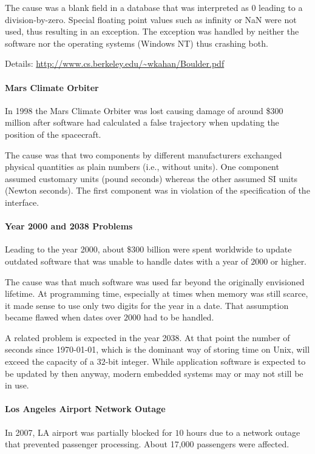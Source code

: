 The cause was a blank field in a database that was interpreted as $0$ leading to a division-by-zero.
Special floating point values such as infinity or NaN were not used, thus resulting in an exception.
The exception was handled by neither the software nor the operating systems (Windows NT) thus crashing both.

Details: \url{http://www.cs.berkeley.edu/~wkahan/Boulder.pdf}

\paragraph{Mars Climate Orbiter}
In 1998 the Mars Climate Orbiter was lost causing damage of around \$$300$ million after software had calculated a false trajectory when updating the position of the spacecraft.

The cause was that two components by different manufacturers exchanged physical quantities as plain numbers (i.e., without units).
One component assumed customary units (pound seconds) whereas the other assumed SI units (Newton seconds).
The first component was in violation of the specification of the interface.

\paragraph{Year 2000 and 2038 Problems}
Leading to the year 2000, about \$$300$ billion were spent worldwide to update outdated software that was unable to handle dates with a year of $2000$ or higher.

The cause was that much software was used far beyond the originally envisioned lifetime.
At programming time, especially at times when memory was still scarce, it made sense to use only two digits for the year in a date.
That assumption became flawed when dates over $2000$ had to be handled.

A related problem is expected in the year 2038.
At that point the number of seconds since 1970-01-01, which is the dominant way of storing time on Unix, will exceed the capacity of a $32$-bit integer.
While application software is expected to be updated by then anyway, modern embedded systems may or may not still be in use.

\paragraph{Los Angeles Airport Network Outage}
In 2007, LA airport was partially blocked for $10$ hours due to a network outage that prevented passenger processing.
About 17,000 passengers were affected.

